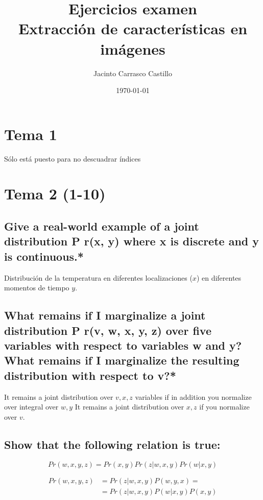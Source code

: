 \documentclass[11pt]{article}
\author{Jacinto Carrasco Castillo}
\date{\today}
\title{Ejercicios examen\\\medskip
\large Extracción de características en imágenes}
\begin{document}
\maketitle
\tableofcontents


\section{Tema 1}
\label{sec:org69a7ec6}

Sólo está puesto para no descuadrar índices 

\section{Tema 2 (1-10)}
\label{sec:org5c3bf5b}
\subsection{Give a real-world example of a joint distribution P r(x, y) where x is discrete and y is continuous.*}
\label{sec:org3f9635a}

Distribución de la temperatura en diferentes localizaciones (\(x\)) en
diferentes momentos de tiempo \(y\).

\subsection{What remains if I marginalize a joint distribution P r(v, w, x, y, z) over five variables with respect to variables w and y? What remains if I marginalize the resulting distribution with respect to v?*}
\label{sec:org347425e}


It remains a joint distribution over \(v,x,z\) variables if in addition
you normalize over integral over \(w,y\)
It remains a joint distribution over \(x,z\) if you normalize over \(v\).


\subsection{Show that the following relation is true:}
\label{sec:org40a2f6e}
\[ Pr(w, x, y, z) = Pr(x, y) Pr(z|w, x, y) Pr(w|x, y) \]

\begin{align} 
Pr(w, x, y, z) &= Pr(z | w, x, y) P(w, y, x)  = \\
	&= Pr(z | w, x, y) P(w| x, y) P(x, y)
\end{align}
\end{document}
